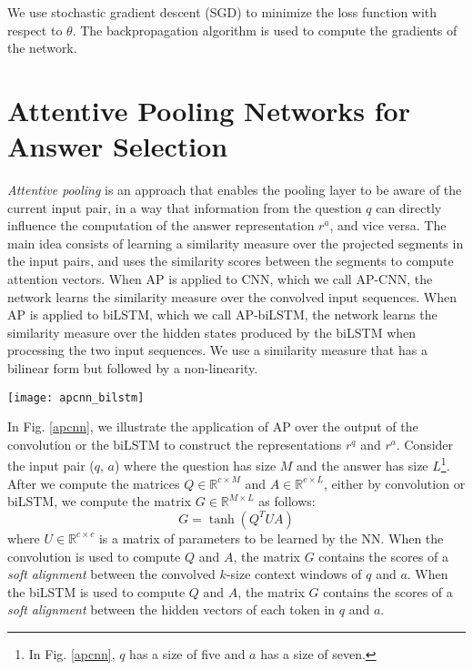 \documentclass{article}
\begin{document}
We use stochastic gradient descent (SGD) to minimize the
loss function with respect to $\theta$. 
The backpropagation algorithm is used to compute the gradients of the network. \section{Attentive Pooling Networks for Answer Selection}
\label{ap_networks}
\emph{Attentive pooling} is an approach that enables the pooling layer to be aware of the current input pair, 
in a way that information from the question $q$ can directly influence the computation of the answer representation $r^a$, 
and vice versa.
The main idea consists of learning a similarity measure over the projected segments in the input pairs,
and uses the similarity scores between the segments to compute attention vectors.
When AP is applied to CNN,
which we call AP-CNN,
the network learns the similarity measure over the convolved input sequences.
When AP is applied to biLSTM,
which we call AP-biLSTM,
the network learns the similarity measure over the hidden states produced by the biLSTM when processing the two input sequences.
We use a similarity measure that has a bilinear form but followed by a non-linearity.

\begin{figure*}[ht]
\vskip 0.2in
\begin{center}
\centerline{\texttt{[image: apcnn\_bilstm]}}
\caption{Attentive Pooling Networks for Answer Selection.}
\label{apcnn}
\end{center}
\vskip -0.2in
\end{figure*}

In Fig. \ref{apcnn}, 
we illustrate the application of AP over the output of the convolution or the biLSTM to construct the representations $r^q$ and $r^a$.
Consider the input pair ($q$, $a$) where the question has size $M$ and the answer has size $L$\footnote{In Fig. \ref{apcnn}, $q$ has a size of five and $a$ has a size of seven.}.
After we compute the matrices $Q \in \mathbb{R}^{c \times M}$ and  $A \in \mathbb{R}^{c \times L}$,
either by convolution or biLSTM,
we compute the matrix $G \in \mathbb{R}^{M \times L}$  as follows:
\begin{equation} \label{computing_g}
G = \tanh \left( Q^{T}UA \right)
\end{equation}
where $U \in \mathbb{R}^{c \times c}$ is a matrix of parameters to be learned by the NN.
When the convolution is used to compute $Q$ and $A$,
the matrix $G$ contains the scores of a \emph{soft alignment} between the convolved $k$-size context windows of $q$ and $a$.
When the biLSTM is used to compute $Q$ and $A$,
the matrix $G$ contains the scores of a \emph{soft alignment} between the hidden vectors of each token in $q$ and $a$.
\end{document}
